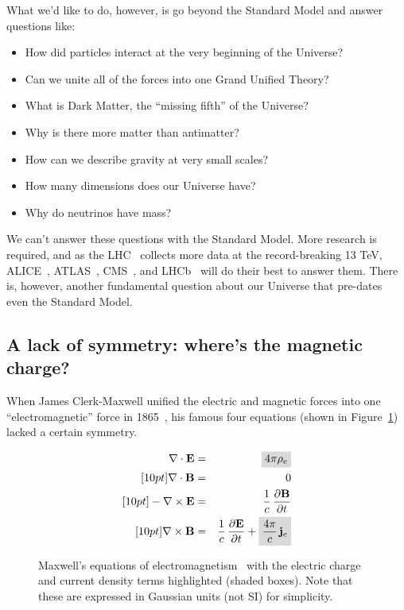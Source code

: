 What we'd like to do, however, is go beyond the Standard Model and
answer questions like:
\begin{itemize}
\item How did particles interact at the very beginning of the Universe?
\item Can we unite all of the forces into one Grand Unified Theory?
\item What is Dark Matter, the ``missing fifth'' of the Universe?
\item Why is there more matter than antimatter?
\item How can we describe gravity at very small scales?
\item How many dimensions does our Universe have?
\item Why do neutrinos have mass?
\end{itemize}
We can't answer these questions with the Standard Model.
More research is required, and as the \acs{LHC}~\cite{LHC2008} collects
more data at the record-breaking 13 \ac{TeV},
\acs{ALICE}~\cite{ALICE2008},
\acs{ATLAS}~\cite{ATLAS2008},
\acs{CMS}~\cite{CMS2008},
and
\acs{LHCb}~\cite{LHCb2008}
will do their best to answer them.
There is, however, another fundamental question about our Universe
that pre-dates even the Standard Model.

\newpage

\subsection{A lack of symmetry: where’s the magnetic charge?}
\label{sec:magcharge}
When James Clerk-Maxwell unified the electric and magnetic forces into one
``electromagnetic'' force in 1865~\cite{Maxwell1865},
his famous four equations (shown in Figure~\ref{fig:maxwellseqs})
lacked a certain symmetry.

\begin{figure}[htbp]
  \centering
\begin{eqnarray}
\label{eq:1} \divvec{\electricfield} & = & \highlight{4 \pi \electricchargedensity} \\ [10pt]
\label{eq:2} \divvec{\magneticfield} & = & 0\\ [10pt]
\label{eq:3} - \curlvec{\electricfield} & = & \myfrac{1}{\speedoflight} \, \timediff{\magneticfield}\\ [10pt]
\label{eq:4}   \curlvec{\magneticfield} & = & \myfrac{1}{\speedoflight} \, \timediff{\electricfield} + \highlight{\myfrac{4 \pi}{\speedoflight} \, \electriccurrentdensity}
\end{eqnarray}
  \caption[Maxwell's equations of electromagnetism]
  {\label{fig:maxwellseqs}Maxwell's equations of electromagnetism~\cite{Maxwell1865} with the electric charge and current density terms highlighted (shaded boxes). Note that these are expressed in Gaussian units (not SI) for simplicity.}
\end{figure}

